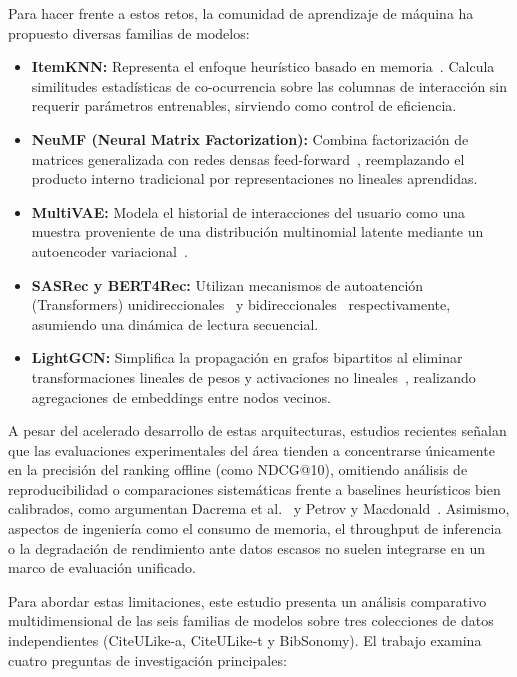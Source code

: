 \documentclass[journal]{IEEEtran}
\makeatletter
\newcommand{\at}[1]{@#1}
\makeatother
\begin{document}
Para hacer frente a estos retos, la comunidad de aprendizaje de máquina ha propuesto diversas familias de modelos:
\begin{itemize}
    \item \textbf{ItemKNN:} Representa el enfoque heurístico basado en memoria~\cite{sarwar2001item}. Calcula similitudes estadísticas de co-ocurrencia sobre las columnas de interacción sin requerir parámetros entrenables, sirviendo como control de eficiencia.
    \item \textbf{NeuMF (Neural Matrix Factorization):} Combina factorización de matrices generalizada con redes densas feed-forward~\cite{he2017neural}, reemplazando el producto interno tradicional por representaciones no lineales aprendidas.
    \item \textbf{MultiVAE:} Modela el historial de interacciones del usuario como una muestra proveniente de una distribución multinomial latente mediante un autoencoder variacional~\cite{liang2018variational}.
    \item \textbf{SASRec y BERT4Rec:} Utilizan mecanismos de autoatención (Transformers) unidireccionales~\cite{kang2018self} y bidireccionales~\cite{sun2019bert4rec} respectivamente, asumiendo una dinámica de lectura secuencial.
    \item \textbf{LightGCN:} Simplifica la propagación en grafos bipartitos al eliminar transformaciones lineales de pesos y activaciones no lineales~\cite{he2020lightgcn}, realizando agregaciones de embeddings entre nodos vecinos.
\end{itemize}

A pesar del acelerado desarrollo de estas arquitecturas, estudios recientes señalan que las evaluaciones experimentales del área tienden a concentrarse únicamente en la precisión del ranking offline (como NDCG\at{10}), omitiendo análisis de reproducibilidad o comparaciones sistemáticas frente a baselines heurísticos bien calibrados, como argumentan Dacrema et al.~\cite{dacrema2019really} y Petrov y Macdonald~\cite{petrov2023effective}. Asimismo, aspectos de ingeniería como el consumo de memoria, el throughput de inferencia o la degradación de rendimiento ante datos escasos no suelen integrarse en un marco de evaluación unificado.

Para abordar estas limitaciones, este estudio presenta un análisis comparativo multidimensional de las seis familias de modelos sobre tres colecciones de datos independientes (CiteULike-a, CiteULike-t y BibSonomy). El trabajo examina cuatro preguntas de investigación principales:
\end{document}
